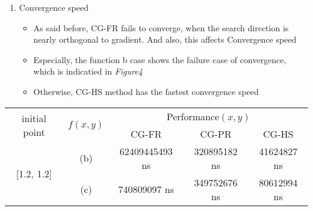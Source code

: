 \documentclass{standalone}
\begin{document}
\begin{enumerate}
  \item Convergence speed
  \begin{itemize}
    \item As said before, CG-FR fails to converge, when the search direction is nearly orthogonal to gradient. And also, this affects
    Convergence speed
    \item Especially, the function b case shows the failure case of convergence, which is indicatied in \emph{Figure4}
    \item Otherwise, CG-HS method has the fastest convergence speed
  \end{itemize}
\end{enumerate}
\begin{center}
  \begin{tabular}{| c | c | c | c | c | } \hline
  \multirow{2}{*}{initial point} & \multirow{2}{*}{$f(x, y)$}   & \multicolumn{3}{c|}{Performance$(x, y)$} \\ \cline{3-5}
                                  &                              & CG-FR            & CG-PR        & CG-HS \\ \hline
  \multirow{2}{*}{[1.2, 1.2]}     & (b)                          & 62409445493 ns   & 320895182 ns & 41624827 ns \\ 
                                  & (c)                          & 740809097 ns     & 349752676 ns & 80612994 ns \\ \hline
  \end{tabular}
\end{center}
\end{document}
